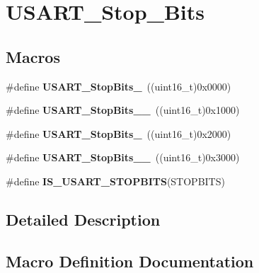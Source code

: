 \hypertarget{group___u_s_a_r_t___stop___bits}{}\section{U\+S\+A\+R\+T\+\_\+\+Stop\+\_\+\+Bits}
\label{group___u_s_a_r_t___stop___bits}
\subsection*{Macros}
\begin{DoxyCompactItemize}
\item 
\#define {\bfseries U\+S\+A\+R\+T\+\_\+\+Stop\+Bits\+\_}~((uint16\+\_\+t)0x0000)\hypertarget{group___u_s_a_r_t___stop___bits_gae2cb35620ba001f0d63e9e0be93e4a05}{}\label{group___u_s_a_r_t___stop___bits_gae2cb35620ba001f0d63e9e0be93e4a05}

\item 
\#define {\bfseries U\+S\+A\+R\+T\+\_\+\+Stop\+Bits\+\_\+\_}~((uint16\+\_\+t)0x1000)\hypertarget{group___u_s_a_r_t___stop___bits_ga2ad06e3acfb691735d05ab9a314e2e32}{}\label{group___u_s_a_r_t___stop___bits_ga2ad06e3acfb691735d05ab9a314e2e32}

\item 
\#define {\bfseries U\+S\+A\+R\+T\+\_\+\+Stop\+Bits\+\_}~((uint16\+\_\+t)0x2000)\hypertarget{group___u_s_a_r_t___stop___bits_ga652058b6be2f48ac0d82d0e75537fc81}{}\label{group___u_s_a_r_t___stop___bits_ga652058b6be2f48ac0d82d0e75537fc81}

\item 
\#define {\bfseries U\+S\+A\+R\+T\+\_\+\+Stop\+Bits\+\_\+\_}~((uint16\+\_\+t)0x3000)\hypertarget{group___u_s_a_r_t___stop___bits_ga30897cc46d5b3790a9b14ffaba354527}{}\label{group___u_s_a_r_t___stop___bits_ga30897cc46d5b3790a9b14ffaba354527}

\item 
\#define {\bfseries I\+S\+\_\+\+U\+S\+A\+R\+T\+\_\+\+S\+T\+O\+P\+B\+I\+TS}(S\+T\+O\+P\+B\+I\+TS)
\end{DoxyCompactItemize}


\subsection{Detailed Description}


\subsection{Macro Definition Documentation}
